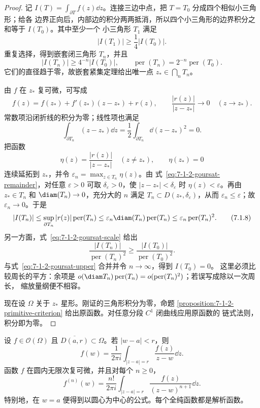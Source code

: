 \begin{proof}
记 $I(T)=\int_{\partial T}f(z)\dd z$。连接三边中点，把 $T=T_0$ 分成四个相似小三角形；给各
边界正向后，内部边的积分两两抵消，所以四个小三角形的边界积分之和等于 $I(T_0)$。其中至少一个
小三角形 $T_1$ 满足
\[
  |I(T_1)|\ge\frac14|I(T_0)|.
\]
重复选择，得到嵌套闭三角形 $T_n$，并且
\[
 |I(T_n)|\ge4^{-n}|I(T_0)|,
 \qquad
 \operatorname{per}(T_n)=2^{-n}\operatorname{per}(T_0).
 \tag{7.1.6}\label{eq:7-1-2-goursat-scale}
\]
它们的直径趋于零，故嵌套紧集定理给出唯一点
$z_*\in\bigcap_nT_n$。

由 $f$ 在 $z_*$ 复可微，可写成
\[
 f(z)=f(z_*)+f'(z_*)(z-z_*)+r(z),
 \qquad
 \frac{|r(z)|}{|z-z_*|}\longrightarrow0\quad(z\to z_*).
 \tag{7.1.7}\label{eq:7-1-2-goursat-remainder}
\]
常数项沿闭折线的积分为零；线性项也满足
\[
 \int_{\partial T_n}(z-z_*)\dd z
 =\frac12\int_{\partial T_n}\dd (z-z_*)^2=0.
\]
把函数
\[
 \eta(z)=\frac{|r(z)|}{|z-z_*|}\quad(z\ne z_*),
 \qquad \eta(z_*)=0
\]
连续延拓到 $z_*$，并令 $\varepsilon_n=\max_{z\in T_n}\eta(z)$。由
式~\eqref{eq:7-1-2-goursat-remainder}，对任意 $\varepsilon>0$ 可取 $\delta_\varepsilon>0$，使
$|z-z_*|<\delta_\varepsilon$ 时 $\eta(z)<\varepsilon$。再由 $z_*\in T_n$ 和
$\diam(T_n)\to0$，充分大的 $n$ 满足 $T_n\subset D(z_*,\delta_\varepsilon)$，从而
$\varepsilon_n\leq\varepsilon$；故 $\varepsilon_n\to0$。于是
\[
 |I(T_n)|
 \le \sup_{\partial T_n}|r(z)|\operatorname{per}(T_n)
 \le \varepsilon_n\diam(T_n)\operatorname{per}(T_n)
 \le \varepsilon_n\operatorname{per}(T_n)^2.
 \tag{7.1.8}\label{eq:7-1-2-goursat-upper}
\]
另一方面，式~\eqref{eq:7-1-2-goursat-scale} 给出
\[
 \frac{|I(T_n)|}{\operatorname{per}(T_n)^2}
 \ge\frac{|I(T_0)|}{\operatorname{per}(T_0)^2}.
\]
与式~\eqref{eq:7-1-2-goursat-upper} 合并并令 $n\to\infty$，得到 $I(T_0)=0$。
这里必须比较周长的平方：余项是
$o(\diam T_n)\operatorname{per}(T_n)=o(\operatorname{per}(T_n)^2)$；若误写成除以一次周长，
缩放量纲便不相容。

现在设 $\Omega$ 关于 $z_*$ 星形。刚证的三角形积分为零，命题
\ref{proposition:7-1-2-primitive-criterion} 给出原函数。对任意分段 $C^1$ 闭曲线应用原函数的
链式法则，积分即为零。
\end{proof}

\begin{theorem}\label{theorem:7-1-2-2}
设 $f\in\mathcal O(\Omega)$ 且 $\overline{D(a,r)}\subset\Omega$。若 $|w-a|<r$，则
\[
 f(w)=\frac1{2\pi i}\int_{|z-a|=r}\frac{f(z)}{z-w}\dd z.
 \tag{7.1.9}\label{eq:7-1-2-cauchy-value}
\]
函数 $f$ 在圆内无限次复可微，并且对每个 $n\ge0$，
\[
 f^{(n)}(w)=\frac{n!}{2\pi i}
 \int_{|z-a|=r}\frac{f(z)}{(z-w)^{n+1}}\dd z.
 \tag{7.1.10}\label{eq:7-1-2-cauchy-derivative}
\]
特别地，在 $w=a$ 便得到以圆心为中心的公式。每个全纯函数都是解析函数。
\end{theorem}

